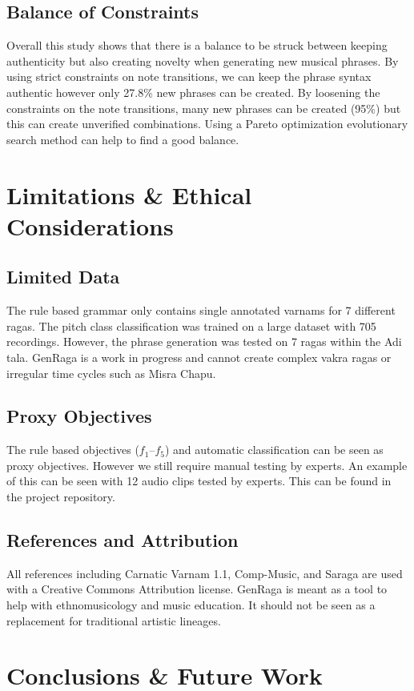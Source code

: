 \documentclass[conference,letterpaper]{IEEEtran}
\begin{document}
\subsection{Balance of Constraints}
Overall this study shows that there is a balance to be struck between keeping authenticity but also creating novelty when generating new musical phrases. By using strict constraints on note transitions, we can keep the phrase syntax authentic however only 27.8\% new phrases can be created. By loosening the constraints on the note transitions, many new phrases can be created (95\%) but this can create unverified combinations. Using a Pareto optimization evolutionary search method can help to find a good balance.

\section{Limitations \& Ethical Considerations}
\subsection{Limited Data}
The rule based grammar only contains single annotated varnams for 7 different ragas. The pitch class classification was trained on a large dataset with 705 recordings. However, the phrase generation was tested on 7 ragas within the Adi tala. GenRaga is a work in progress and cannot create complex vakra ragas or irregular time cycles such as Misra Chapu.

\subsection{Proxy Objectives}
The rule based objectives ($f_1$--$f_5$) and automatic classification can be seen as proxy objectives. However we still require manual testing by experts. An example of this can be seen with 12 audio clips tested by experts. This can be found in the project repository.

\subsection{References and Attribution}
All references including Carnatic Varnam 1.1, Comp-Music, and Saraga are used with a Creative Commons Attribution license. GenRaga is meant as a tool to help with ethnomusicology and music education. It should not be seen as a replacement for traditional artistic lineages.

\section{Conclusions \& Future Work}
\end{document}
